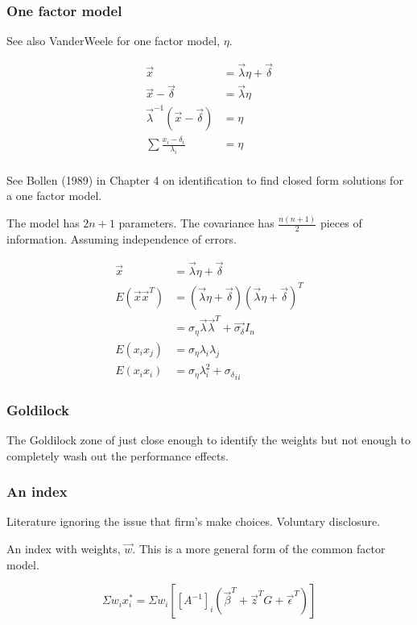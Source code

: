 \documentclass[]{article} %
\begin{document}
\subsubsection{One factor model}

See also VanderWeele for one factor model, $\eta$.

\begin{align*}
    \vec{x} &= \vec{\lambda} \eta + \vec{\delta} \\
    \vec{x} - \vec{\delta} &= \vec{\lambda} \eta \\
    \vec{\lambda}^{-1} (\vec{x} - \vec{\delta}) &= \eta \\ 
    \sum \frac{x_i - \delta_i}{\lambda_i} &= \eta \\
\end{align*}

See Bollen (1989) in Chapter 4 on identification to find closed form solutions for a 
one factor model.

The model has $2n + 1$ parameters. The covariance has $\frac{n (n+1)}{2}$ pieces of information. Assuming independence of errors.

\begin{align*}
    \vec{x} &= \vec{\lambda} \eta + \vec{\delta} \\
    E(\vec{x} \vec{x}^{T}) &= (\vec{\lambda} \eta + \vec{\delta})
        (\vec{\lambda} \eta + \vec{\delta})^{T} \\
    &= \sigma_{\eta} \vec{\lambda} \vec{\lambda}^{T} + \vec{\sigma_{\delta}} I_n \\
    E(x_i x_j) &= \sigma_{\eta} \lambda_i \lambda_j \\ 
    E(x_i x_i) &= \sigma_{\eta} \lambda_i^2 + {\sigma_{\delta}}_{ii}
\end{align*}

\subsubsection{Goldilock}

The Goldilock zone of just close enough to identify the weights but not enough to completely wash out the performance effects.

\subsubsection{An index}

Literature ignoring the issue that firm's make choices. Voluntary disclosure.

An index with weights, $\vec{w}$. This is a more general form of the common factor model.

\begin{equation}
\label{eq:index}
    \Sigma w_i x^*_i = 
    \Sigma w_i [[A^{-1}]_i (\vec{\beta}^T + \vec{z}^T G + \vec{\epsilon}^T)]
\end{equation}
\end{document}
